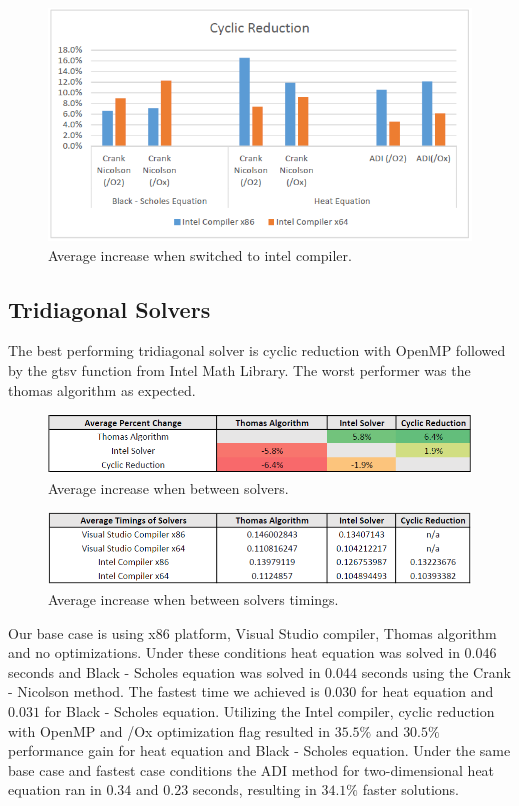\documentclass[12pt, oneside]{book}
\theoremstyle{plain}
\theoremstyle{definition}
\begin{document}
\begin{figure}[!htb]
    \centering
        \includegraphics[scale=0.6]{cyclicFlagBar.png}
    \caption{Average increase when switched to intel compiler.}
\end{figure}


\subsection{Tridiagonal Solvers} 
The best performing tridiagonal solver is cyclic reduction with OpenMP followed by the gtsv function from Intel Math Library. The worst performer was the thomas algorithm as expected.

 \begin{figure}[!htb]
    \centering
        \includegraphics[scale=0.7]{solverAveragePercentage.png}
    \caption{Average increase when between solvers.}
\end{figure}
\begin{figure}[!htb]
    \centering
        \includegraphics[scale=0.6]{solverAverage.png}
    \caption{Average increase when between solvers timings.}
\end{figure}

Our base case is using x86 platform, Visual Studio compiler, Thomas algorithm and no optimizations. Under these conditions heat equation was solved in $0.046$ seconds and Black - Scholes equation was solved in $0.044$ seconds using the Crank - Nicolson method. The fastest time we achieved is $0.030$ for heat equation and $0.031$ for Black - Scholes equation. Utilizing the Intel compiler, cyclic reduction with OpenMP and /Ox optimization flag resulted in $35.5 \%$ and $30.5 \%$ performance gain for heat equation and Black - Scholes equation. Under the same base case and fastest case conditions the ADI method for two-dimensional heat equation ran in $0.34$ and $0.23$ seconds, resulting in $34.1 \%$ faster solutions.
\end{document}
